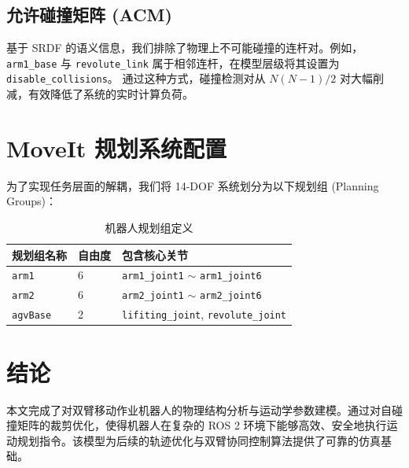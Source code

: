 \documentclass[12pt,a4paper]{article}
\begin{document}
\subsection{允许碰撞矩阵 (ACM)}
基于 SRDF 的语义信息，我们排除了物理上不可能碰撞的连杆对。例如，\texttt{arm1\_base} 与 \texttt{revolute\_link} 属于相邻连杆，在模型层级将其设置为 \texttt{disable\_collisions}。
通过这种方式，碰撞检测对从 $N(N-1)/2$ 对大幅削减，有效降低了系统的实时计算负荷。

\section{MoveIt 规划系统配置}
为了实现任务层面的解耦，我们将 14-DOF 系统划分为以下规划组 (Planning Groups)：
\begin{table}[h]
\centering
\caption{机器人规划组定义}
\begin{tabular}{@{}lll@{}}
\toprule
规划组名称 & 自由度 & 包含核心关节 \\ \midrule
\texttt{arm1} & 6 & \texttt{arm1\_joint1} $\sim$ \texttt{arm1\_joint6} \\
\texttt{arm2} & 6 & \texttt{arm2\_joint1} $\sim$ \texttt{arm2\_joint6} \\
\texttt{agvBase} & 2 & \texttt{lifiting\_joint}, \texttt{revolute\_joint} \\ \bottomrule
\end{tabular}
\end{table}

\section{结论}
本文完成了对双臂移动作业机器人的物理结构分析与运动学参数建模。通过对自碰撞矩阵的裁剪优化，使得机器人在复杂的 ROS 2 环境下能够高效、安全地执行运动规划指令。该模型为后续的轨迹优化与双臂协同控制算法提供了可靠的仿真基础。
\end{document}
